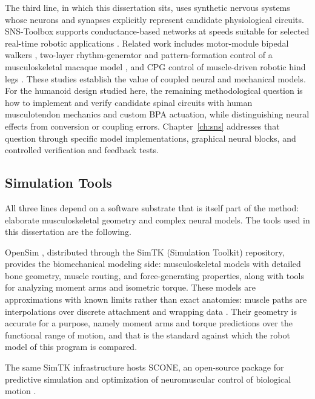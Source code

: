 The third line, in which this dissertation sits, uses synthetic nervous systems whose neurons and synapses explicitly represent candidate physiological circuits. SNS-Toolbox supports conductance-based networks at speeds suitable for selected real-time robotic applications \citep{nourse_sns_2023}. Related work includes motor-module bipedal walkers \citep{ichimura_pathological_2019}, two-layer rhythm-generator and pattern-formation control of a musculoskeletal macaque model \citep{nishizaki_gait_2026}, and CPG control of muscle-driven robotic hind legs \citep{fukuoka_autonomous_2021}. These studies establish the value of coupled neural and mechanical models. For the humanoid design studied here, the remaining methodological question is how to implement and verify candidate spinal circuits with human musculotendon mechanics and custom BPA actuation, while distinguishing neural effects from conversion or coupling errors. Chapter~\ref{ch:sns} addresses that question through specific model implementations, graphical neural blocks, and controlled verification and feedback tests.

\subsection{Simulation Tools}\label{sec:bg_tools}

All three lines depend on a software substrate that is itself part of the method: elaborate musculoskeletal geometry and complex neural models. The tools used in this dissertation are the following.

OpenSim \citep{delp_opensim_2007, seth_opensim_2018}, distributed through the SimTK (Simulation Toolkit) repository, provides the biomechanical modeling side: musculoskeletal models with detailed bone geometry, muscle routing, and force-generating properties, along with tools for analyzing moment arms and isometric torque. These models are approximations with known limits rather than exact anatomies: muscle paths are interpolations over discrete attachment and wrapping data \citep{bolen_bipedal_2019}. Their geometry is accurate for a purpose, namely moment arms and torque predictions over the functional range of motion, and that is the standard against which the robot model of this program is compared. 

The same SimTK infrastructure hosts SCONE, an open-source package for predictive simulation and optimization of neuromuscular control of biological motion \citep{geijtenbeek_scone_2019}. 

